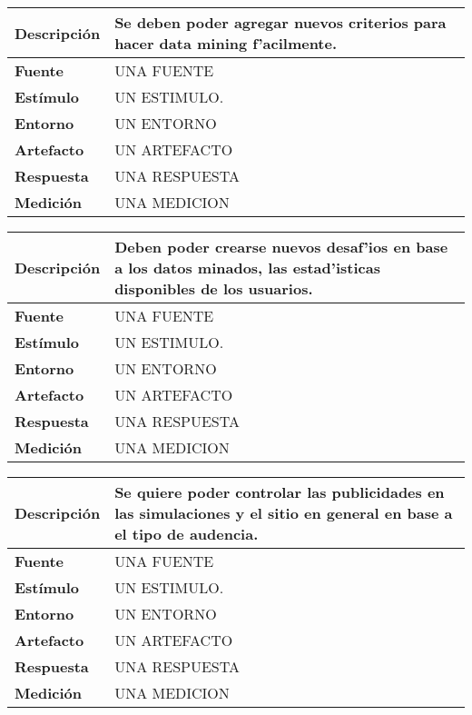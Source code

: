 \begin{center}
  \begin{tabular}{| l | p{10cm} | }
    \hline
  \textbf{Descripción} & Se deben poder agregar nuevos criterios para hacer data mining f'acilmente.\\  \hline
  \textbf{Fuente} & UNA FUENTE\\  \hline
  \textbf{Estímulo} & UN ESTIMULO.\\  \hline
  \textbf{Entorno} & UN ENTORNO\\  \hline
  \textbf{Artefacto} & UN ARTEFACTO\\  \hline
  \textbf{Respuesta} & UNA RESPUESTA\\  \hline
  \textbf{Medición} & UNA MEDICION\\  \hline
  \end{tabular}
\end{center} 
\begin{center}
  \begin{tabular}{| l | p{10cm} | }
    \hline
  \textbf{Descripción} & Deben poder crearse nuevos desaf'ios en base a los datos minados, las estad'isticas disponibles de los usuarios.\\  \hline
  \textbf{Fuente} & UNA FUENTE\\  \hline
  \textbf{Estímulo} & UN ESTIMULO.\\  \hline
  \textbf{Entorno} & UN ENTORNO\\  \hline
  \textbf{Artefacto} & UN ARTEFACTO\\  \hline
  \textbf{Respuesta} & UNA RESPUESTA\\  \hline
  \textbf{Medición} & UNA MEDICION\\  \hline
  \end{tabular}
\end{center} 

\begin{center}
  \begin{tabular}{| l | p{10cm} | }
    \hline
  \textbf{Descripción} & Se quiere poder controlar las publicidades en las simulaciones y el sitio en general en base a el tipo de audencia.\\  \hline
  \textbf{Fuente} & UNA FUENTE\\  \hline
  \textbf{Estímulo} & UN ESTIMULO.\\  \hline
  \textbf{Entorno} & UN ENTORNO\\  \hline
  \textbf{Artefacto} & UN ARTEFACTO\\  \hline
  \textbf{Respuesta} & UNA RESPUESTA\\  \hline
  \textbf{Medición} & UNA MEDICION\\  \hline
  \end{tabular}
\end{center} 

